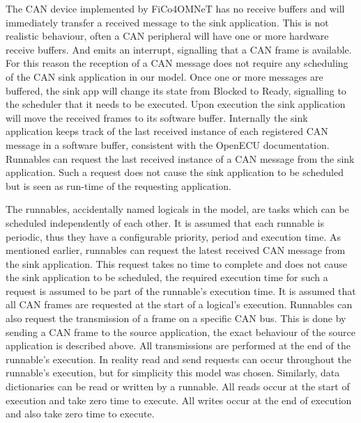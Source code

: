 The CAN device implemented by FiCo4OMNeT has no receive buffers and will immediately transfer a received message to the sink application. This is not realistic behaviour, often a CAN peripheral will have one or more hardware receive buffers. And emits an interrupt, signalling that a CAN frame is available. For this reason the reception of a CAN message does not require any scheduling of the CAN sink application in our model. Once one or more messages are buffered, the sink app will change its state from Blocked to Ready, signalling to the scheduler that it needs to be executed. Upon execution the sink application will move the received frames to its software buffer. Internally the sink application keeps track of the last received instance of each registered CAN message in a software buffer, consistent with the OpenECU documentation. Runnables can request the last received instance of a CAN message from the sink application. Such a request does not cause the sink application to be scheduled but is seen as run-time of the requesting application.

The runnables, accidentally named logicals in the model, are tasks which can be scheduled independently of each other. It is assumed that each runnable is periodic, thus they have a configurable priority, period and execution time. As mentioned earlier, runnables can request the latest received CAN message from the sink application. This request takes no time to complete and does not cause the sink application to be scheduled, the required execution time for such a request is assumed to be part of the runnable's execution time. It is assumed that all CAN frames are requested at the start of a logical's execution. Runnables can also request the transmission of a frame on a specific CAN bus. This is done by sending a CAN frame to the source application, the exact behaviour of the source application is described above. All transmissions are performed at the end of the runnable's execution. In reality read and send requests can occur throughout the runnable's execution, but for simplicity this model was chosen. Similarly, data dictionaries can be read or written by a runnable. All reads occur at the start of execution and take zero time to execute. All writes occur at the end of execution and also take zero time to execute.

